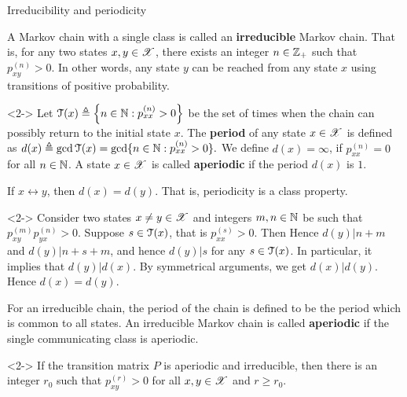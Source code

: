 \documentclass[12pt,aspectratio=169]{beamer}
\begin{document}
\begin{frame}{Irreducibility and periodicity}
\begin{Definition} 
A Markov chain with a single class is called an \textbf{irreducible} Markov chain. 
That is, for any two states $x, y \in \mathscr{X}$, there exists an integer $n \in \mathbb{Z}_+$ such that $p_{xy}^{(n)} > 0$. 
In other words, any state $y$ can be reached from any state $x$ using transitions of positive probability. 
\end{Definition}
\begin{Definition}<2->
Let $\mathcal{T}(x) \triangleq \left\{n \in \mathbb{N} : p_{xx}^{(n)} > 0\right\}$ be the set of times when the chain can possibly return to the initial state $x$. 
The \textbf{period} of any state $x \in \mathscr{X}$ is defined as
$
d(x) \triangleq \gcd\mathcal{T}(x) =  \gcd\{n \in \mathbb{N} : p_{xx}^{(n)} > 0\}.
$
We define $d(x) = \infty$, if $p_{xx}^{(n)} = 0$ for all $n \in \mathbb{N}$. 
A state $x \in \mathscr{X}$ is called \textbf{aperiodic} if the period $d(x)$ is $1$. 
\end{Definition}
\end{frame}


\begin{frame}
\begin{prop}
If $x \leftrightarrow y$, then $d(x) = d(y)$. 
That is, periodicity is a class property.
\end{prop}
\begin{Proof}<2->
Consider two states $x\neq y \in \mathscr{X}$ and integers $m,n \in \mathbb{N}$ be such that $p_{xy}^{(m)}p_{yx}^{(n)} > 0$. 
Suppose $s \in \mathcal{T}(x)$, that is $p_{xx}^{(s)} > 0$. Then
Hence $d(y) | n+m$ and $d(y) | n+s+m$, and hence $d(y) | s$ for any $s \in \mathcal{T}(x)$. 
In particular, it implies that $d(y) | d(x)$. 
By symmetrical arguments, we get $d(x) | d(y)$. 
Hence $d(x) = d(y)$.
\end{Proof}
\end{frame}

\begin{frame}
\begin{Definition}
For an irreducible chain, the period of the chain is defined to be the period which is common to all states. 
An irreducible Markov chain is called \textbf{aperiodic} if the single communicating class is aperiodic. 
\end{Definition}
\begin{prop}<2->
If the transition matrix $P$ is aperiodic and irreducible, 
then there is an integer $r_0$ such that $p_{xy}^{(r)}>0$ for all $x,y \in \mathscr{X}$  and $r \ge r_0$. 
\end{prop}
\end{frame}
\end{document}
